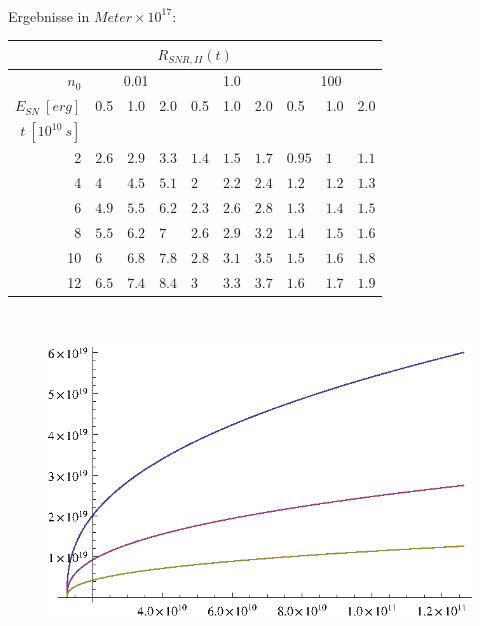 \\
Ergebnisse in $Meter \times 10^{17}$:
\begin{center}
\begin{tabular}{|r|l|l|l|l|l|l|l|l|l|}
\multicolumn{10}{c}{\(R_{SNR,II}(t)\)}\\
\hline
\(n_0\) & \multicolumn{3}{|c|}{0.01} & \multicolumn{3}{|c|}{1.0} & \multicolumn{3}{|c|}{100}\\
\hline
\(E_{SN}~[erg]\) & 0.5 & 1.0 & 2.0 & 0.5 & 1.0 & 2.0 & 0.5 & 1.0 & 2.0\\
\hline
\(t~[10^{10}~s]\) & & & & & & & & & \\
\cline{1-1}
2 & $2.6$ & $2.9$ & $3.3$ &
$1.4$ & $1.5$ & $1.7$ &
$0.95$ & $1$ & $1.1$ \\

4 & $4$ & $4.5$ & $5.1$ &
$2$ & $2.2$ & $2.4$ &
$1.2$ & $1.2$ & $1.3$ \\

6 & $4.9$ & $5.5$ & $6.2$ &
$2.3$ & $2.6$ & $2.8$ &
$1.3$ & $1.4$ & $1.5$\\

8 & $5.5$ & $6.2$ & $7$ &
$2.6$ & $2.9$ & $3.2$ &
$1.4$ & $1.5$ & $1.6$\\

10 & $6$ & $6.8$ & $7.8$ &
$2.8$ & $3.1$ & $3.5$ &
$1.5$ & $1.6$ & $1.8$ \\

12 & $6.5$ & $7.4$ & $8.4$&
$3$ & $3.3$ & $3.7$ &
$1.6$ & $1.7$ & $1.9$ \\

\hline
\end{tabular}\\
\end{center}
\begin{figure}[ht]
\begin{center}
\includegraphics{aufgabe6r.eps}
\end{center}
\end{figure}
